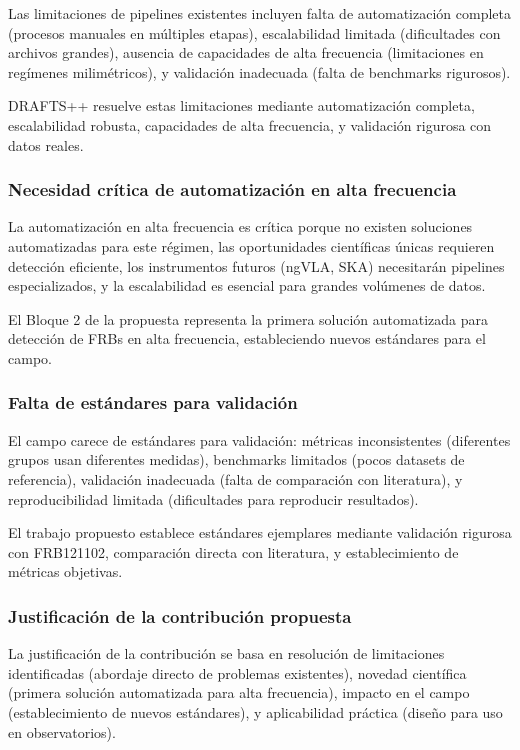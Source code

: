 Las limitaciones de pipelines existentes incluyen falta de automatización completa (procesos manuales en múltiples etapas), escalabilidad limitada (dificultades con archivos grandes), ausencia de capacidades de alta frecuencia (limitaciones en regímenes milimétricos), y validación inadecuada (falta de benchmarks rigurosos).

DRAFTS++ resuelve estas limitaciones mediante automatización completa, escalabilidad robusta, capacidades de alta frecuencia, y validación rigurosa con datos reales.

\subsubsection{Necesidad crítica de automatización en alta frecuencia}

La automatización en alta frecuencia es crítica porque no existen soluciones automatizadas para este régimen, las oportunidades científicas únicas requieren detección eficiente, los instrumentos futuros (ngVLA, SKA) necesitarán pipelines especializados, y la escalabilidad es esencial para grandes volúmenes de datos.

El Bloque 2 de la propuesta representa la primera solución automatizada para detección de FRBs en alta frecuencia, estableciendo nuevos estándares para el campo.

\subsubsection{Falta de estándares para validación}

El campo carece de estándares para validación: métricas inconsistentes (diferentes grupos usan diferentes medidas), benchmarks limitados (pocos datasets de referencia), validación inadecuada (falta de comparación con literatura), y reproducibilidad limitada (dificultades para reproducir resultados).

El trabajo propuesto establece estándares ejemplares mediante validación rigurosa con FRB121102, comparación directa con literatura, y establecimiento de métricas objetivas.

\subsubsection{Justificación de la contribución propuesta}

La justificación de la contribución se basa en resolución de limitaciones identificadas (abordaje directo de problemas existentes), novedad científica (primera solución automatizada para alta frecuencia), impacto en el campo (establecimiento de nuevos estándares), y aplicabilidad práctica (diseño para uso en observatorios).

